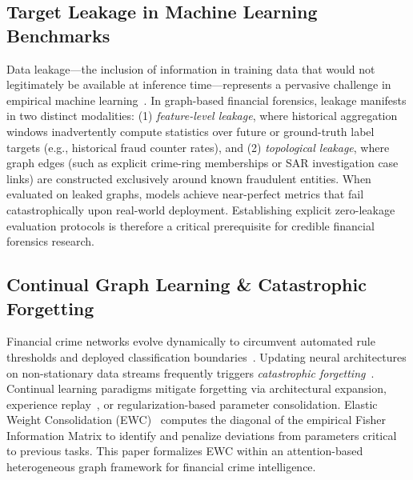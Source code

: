 \subsection{Target Leakage in Machine Learning Benchmarks}
Data leakage—the inclusion of information in training data that would not legitimately be available at inference time—represents a pervasive challenge in empirical machine learning~\cite{kaufman2012leakage,kapoor2023leakage}. In graph-based financial forensics, leakage manifests in two distinct modalities: (1) \textit{feature-level leakage}, where historical aggregation windows inadvertently compute statistics over future or ground-truth label targets (e.g., historical fraud counter rates), and (2) \textit{topological leakage}, where graph edges (such as explicit crime-ring memberships or SAR investigation case links) are constructed exclusively around known fraudulent entities. When evaluated on leaked graphs, models achieve near-perfect metrics that fail catastrophically upon real-world deployment. Establishing explicit zero-leakage evaluation protocols is therefore a critical prerequisite for credible financial forensics research.

\subsection{Continual Graph Learning \&  Catastrophic Forgetting}
Financial crime networks evolve dynamically to circumvent automated rule thresholds and deployed classification boundaries~\cite{wang2020streaming}. Updating neural architectures on non-stationary data streams frequently triggers \textit{catastrophic forgetting}~\cite{kirkpatrick2017overcoming,parisi2019continual,zenke2017continual}. Continual learning paradigms mitigate forgetting via architectural expansion, experience replay~\cite{zhang2022continual}, or regularization-based parameter consolidation. Elastic Weight Consolidation (EWC)~\cite{kirkpatrick2017overcoming} computes the diagonal of the empirical Fisher Information Matrix to identify and penalize deviations from parameters critical to previous tasks. This paper formalizes EWC within an attention-based heterogeneous graph framework for financial crime intelligence.
